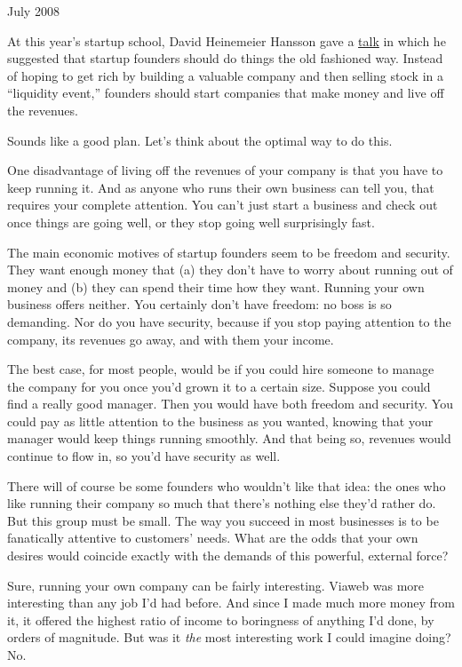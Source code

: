 July 2008

At this year's startup school, David Heinemeier Hansson gave a
\href{http://www.omnisio.com/startupschool08/david-heinemeier-hansson-at-startup-school-08}{talk}
in which he suggested that startup founders should do things the old
fashioned way. Instead of hoping to get rich by building a valuable
company and then selling stock in a ``liquidity event,'' founders should
start companies that make money and live off the revenues.

Sounds like a good plan. Let's think about the optimal way to do this.

One disadvantage of living off the revenues of your company is that you
have to keep running it. And as anyone who runs their own business can
tell you, that requires your complete attention. You can't just start a
business and check out once things are going well, or they stop going
well surprisingly fast.

The main economic motives of startup founders seem to be freedom and
security. They want enough money that (a) they don't have to worry about
running out of money and (b) they can spend their time how they want.
Running your own business offers neither. You certainly don't have
freedom: no boss is so demanding. Nor do you have security, because if
you stop paying attention to the company, its revenues go away, and with
them your income.

The best case, for most people, would be if you could hire someone to
manage the company for you once you'd grown it to a certain size.
Suppose you could find a really good manager. Then you would have both
freedom and security. You could pay as little attention to the business
as you wanted, knowing that your manager would keep things running
smoothly. And that being so, revenues would continue to flow in, so
you'd have security as well.

There will of course be some founders who wouldn't like that idea: the
ones who like running their company so much that there's nothing else
they'd rather do. But this group must be small. The way you succeed in
most businesses is to be fanatically attentive to customers' needs. What
are the odds that your own desires would coincide exactly with the
demands of this powerful, external force?

Sure, running your own company can be fairly interesting. Viaweb was
more interesting than any job I'd had before. And since I made much more
money from it, it offered the highest ratio of income to boringness of
anything I'd done, by orders of magnitude. But was it \emph{the} most
interesting work I could imagine doing? No.~

